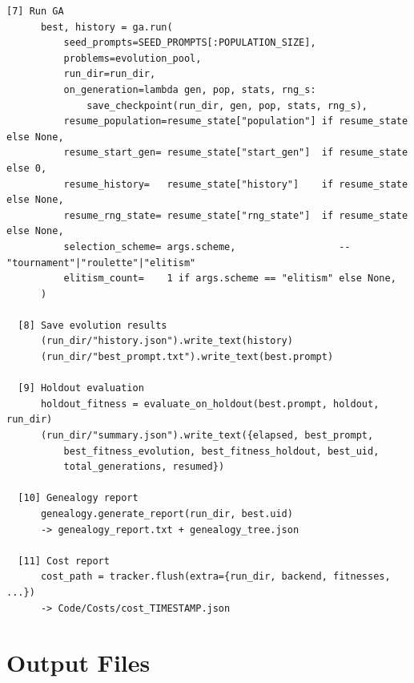 \documentclass[11pt,a4paper]{report}
\begin{document}
\begin{lstlisting}[style=chain]
  [7] Run GA
      best, history = ga.run(
          seed_prompts=SEED_PROMPTS[:POPULATION_SIZE],
          problems=evolution_pool,
          run_dir=run_dir,
          on_generation=lambda gen, pop, stats, rng_s:
              save_checkpoint(run_dir, gen, pop, stats, rng_s),
          resume_population=resume_state["population"] if resume_state else None,
          resume_start_gen= resume_state["start_gen"]  if resume_state else 0,
          resume_history=   resume_state["history"]    if resume_state else None,
          resume_rng_state= resume_state["rng_state"]  if resume_state else None,
          selection_scheme= args.scheme,                  -- "tournament"|"roulette"|"elitism"
          elitism_count=    1 if args.scheme == "elitism" else None,
      )

  [8] Save evolution results
      (run_dir/"history.json").write_text(history)
      (run_dir/"best_prompt.txt").write_text(best.prompt)

  [9] Holdout evaluation
      holdout_fitness = evaluate_on_holdout(best.prompt, holdout, run_dir)
      (run_dir/"summary.json").write_text({elapsed, best_prompt,
          best_fitness_evolution, best_fitness_holdout, best_uid,
          total_generations, resumed})

  [10] Genealogy report
      genealogy.generate_report(run_dir, best.uid)
      -> genealogy_report.txt + genealogy_tree.json

  [11] Cost report
      cost_path = tracker.flush(extra={run_dir, backend, fitnesses, ...})
      -> Code/Costs/cost_TIMESTAMP.json
\end{lstlisting}

\section{Output Files}
\end{document}
